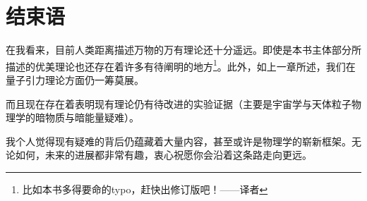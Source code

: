 

\chapter{结束语}
\label{chap13}
在我看来，目前人类距离描述万物的万有理论还十分遥远。即使是本书主体部分所描述的优美理论也还存在着许多有待阐明的地方\footnote{比如本书多得要命的typo，赶快出修订版吧！——译者}。此外，如上一章所述，我们在量子引力理论方面仍一筹莫展。

而且现在存在着表明现有理论仍有待改进的实验证据（主要是宇宙学与天体粒子物理学的暗物质与暗能量疑难）。

我个人觉得现有疑难的背后仍蕴藏着大量内容，甚至或许是物理学的崭新框架。无论如何，未来的进展都非常有趣，衷心祝愿你会沿着这条路走向更远。
